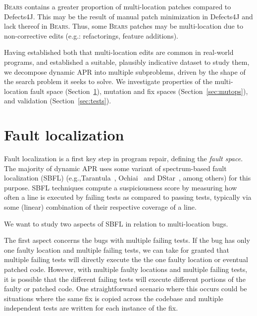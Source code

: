 \documentclass[10pt,journal,compsoc]{IEEEtran}
\newcommand\bears{\textsc{Bears}\xspace}
\begin{document}
\bears contains a greater proportion of 
multi-location patches compared to Defects4J. This may be the 
result of manual patch minimization in Defects4J
and lack thereof in \bears.
Thus, some \bears patches may be multi-location due to
non-corrective edits (e.g.: refactorings, feature additions).

Having established both that multi-location edits are common in real-world
programs, and established a suitable, plausibly indicative dataset to study
them, we decompose dynamic APR into multiple subproblems, driven by the
shape of the search problem it seeks to solve. We 
investigate properties of the multi-location fault space (Section~\ref{secFL}),
mutation and fix spaces (Section~\ref{sec:mutops}), and validation
(Section~\ref{sec:tests}). 

\section{Fault localization} \label{secFL}


Fault localization is a first key step in program repair, defining the
\emph{fault space}. The majority of dynamic APR
uses some variant of spectrum-based fault localization (SBFL) (e.g.,Tarantula~\cite{tarantula},
Ochiai~\cite{ochiai} and DStar~\cite{wong2013dstar}, among others) for this purpose.
%
SBFL techniques compute a suspiciousness score by
measuring how often a line is executed by failing tests as compared to passing
tests, typically via some (linear) combination of their respective
coverage of a line. 

We want to study two aspects of SBFL in relation to multi-location bugs. 


The first aspect concerns the bugs with multiple failing tests.
If the bug has only one faulty location and multiple failing tests,
we can take for granted that multiple failing tests will 
directly execute the the one faulty location or eventual patched code. 
However, with multiple faulty locations and multiple failing tests,
it is possible that the different failing tests will execute different portions of the faulty or patched code. 
One straightforward scenario where this occurs could be situations where the same fix is copied 
across the codebase and multiple independent tests are written for each instance of the fix.
\end{document}
